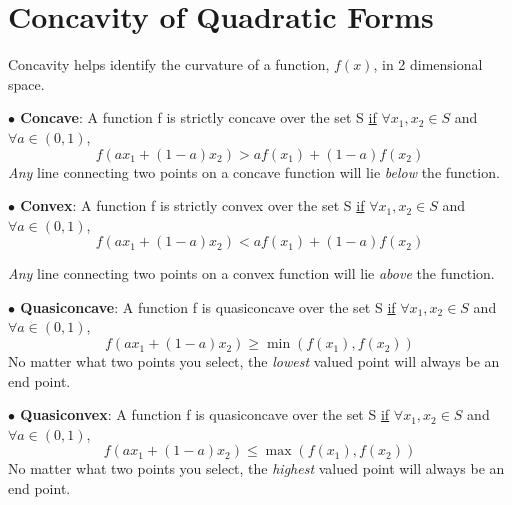 \documentclass[]{book}
\theoremstyle{definition}
\theoremstyle{definition}
\theoremstyle{definition}
\theoremstyle{remark}
\begin{document}
\section{Concavity of Quadratic
Forms}\label{concavity-of-quadratic-forms}

Concavity helps identify the curvature of a function, \(f( x)\), in 2
dimensional space.

\parbox[c]{5in}{{\bf $\bullet$ Concave}: A function f is strictly concave over the set S \underline{if} $\forall x_1,x_2 \in S$ and $\forall a \in (0,1)$, $$f(ax_1 + (1-a)x_2) > af(x_1) + (1-a)f(x_2)$$
\textit{Any} line connecting two points on a concave function will lie \textit{below} the function.}

\begin{comment}
  \parbox{2in}{\texttt{[image: Concave.pdf]}}
\end{comment}

\parbox[c]{5in}{{\bf $\bullet$ Convex}: A function f is strictly convex over the set S \underline{if} $\forall x_1,x_2 \in S$ and $\forall a \in (0,1)$, $$f(ax_1 + (1-a)x_2) < af(x_1) + (1-a)f(x_2)$$

\textit{Any} line connecting two points on a convex function will lie \textit{above} the function.}

\begin{comment}
  \parbox{2in}{\texttt{[image: Convex.pdf]}}
\end{comment}

\parbox[c]{5in}{{\bf $\bullet$ Quasiconcave}: A function f is quasiconcave over the set S \underline{if} $\forall x_1,x_2 \in S$ and $\forall a \in (0,1)$, $$f(ax_1 + (1-a)x_2) \ge \min(f(x_1),f(x_2))$$
No matter what two points you select, the \textit{lowest} valued point will always be an end point.}

\begin{comment}
  \parbox{2in}{\texttt{[image: Quasiconcave.pdf]}}
\end{comment}

\parbox[c]{5in}{{\bf $\bullet$ Quasiconvex}: A function f is quasiconcave over the set S \underline{if} $\forall x_1,x_2 \in S$ and $\forall a \in (0,1)$, $$f(ax_1 + (1-a)x_2) \le \max(f(x_1),f(x_2))$$
No matter what two points you select, the \textit{highest} valued point will always be an end point.}

\begin{comment}
  \parbox{1.8in}{\texttt{[image: Quasiconvex.pdf]}}
\end{comment}
\end{document}
